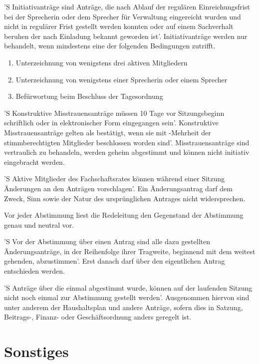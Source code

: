 \documentclass[%
	parskip=half,
]{scrartcl}
\begin{document}
\begin{contract}
'S Initiativanträge sind Anträge, die nach Ablauf der regulären Einreichungsfrist bei der Sprecherin oder dem Sprecher
für Verwaltung eingereicht wurden und nicht in regulärer Frist gestellt werden konnten oder auf einem Sachverhalt
beruhen der nach Einladung bekannt geworden ist'. Initiativanträge werden nur behandelt, wenn mindestens eine der
folgenden Bedingungen zutrifft.
\begin{enumerate}[\qquad a)]
	\item Unterzeichnung von wenigstens drei aktiven Mitgliedern
	\item Unterzeichnung von wenigstens einer Sprecherin oder einem Sprecher
	\item Befürwortung beim Beschluss der Tagesordnung
\end{enumerate}

'S Konstruktive Misstrauensanträge müssen 10 Tage vor Sitzungsbeginn schriftlich oder in elektronischer Form eingegangen
sein'. Konstruktive Misstrauensanträge gelten als bestätigt, wenn sie mit -Mehrheit der stimmberechtigten
Mitglieder beschlossen worden sind'. Misstrauensanträge sind vertraulich zu behandeln, werden geheim abgestimmt und
können nicht initiativ eingebracht werden.

'S Aktive Mitglieder des Fachschaftsrates können während einer Sitzung Änderungen an den Anträgen vorschlagen'. Ein
Änderungsantrag darf dem Zweck, Sinn sowie der Natur des ursprünglichen Antrages nicht widersprechen.


Vor jeder Abstimmung liest die Redeleitung den Gegenstand der Abstimmung genau und neutral vor.

'S Vor der Abstimmung über einen Antrag sind alle dazu gestellten Änderungsanträge, in der Reihenfolge ihrer Tragweite,
beginnend mit dem weitest gehenden, abzustimmen'. Erst danach darf über den eigentlichen Antrag entschieden werden.

'S Anträge über die einmal abgestimmt wurde, können auf der laufenden Sitzung nicht noch einmal zur Abstimmung gestellt
werden'. Ausgenommen hiervon sind unter anderem der Haushaltsplan und andere Anträge, sofern dies in Satzung, Beitrags-,
Finanz- oder Geschäftsordnung anders geregelt ist.

\end{contract}

\section{Sonstiges}
\end{document}
